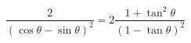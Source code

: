 \begin{displaymath}
 \frac{2}{(\cos \theta -\sin \theta)^2} = 2\frac{1+\tan^2\theta}{(1-\tan \theta)^2}
\end{displaymath}
